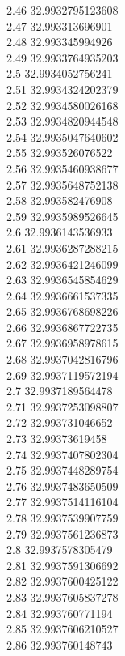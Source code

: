 {2.46	32.9932795123608\\
2.47	32.993313696901\\
2.48	32.993345994926\\
2.49	32.9933764935203\\
2.5	32.9934052756241\\
2.51	32.9934324202379\\
2.52	32.9934580026168\\
2.53	32.9934820944548\\
2.54	32.9935047640602\\
2.55	32.993526076522\\
2.56	32.9935460938677\\
2.57	32.9935648752138\\
2.58	32.993582476908\\
2.59	32.9935989526645\\
2.6	32.9936143536933\\
2.61	32.9936287288215\\
2.62	32.9936421246099\\
2.63	32.9936545854629\\
2.64	32.9936661537335\\
2.65	32.9936768698226\\
2.66	32.9936867722735\\
2.67	32.9936958978615\\
2.68	32.9937042816796\\
2.69	32.9937119572194\\
2.7	32.9937189564478\\
2.71	32.9937253098807\\
2.72	32.993731046652\\
2.73	32.99373619458\\
2.74	32.9937407802304\\
2.75	32.9937448289754\\
2.76	32.9937483650509\\
2.77	32.9937514116104\\
2.78	32.9937539907759\\
2.79	32.9937561236873\\
2.8	32.9937578305479\\
2.81	32.9937591306692\\
2.82	32.9937600425122\\
2.83	32.9937605837278\\
2.84	32.993760771194\\
2.85	32.9937606210527\\
2.86	32.993760148743\\
}
